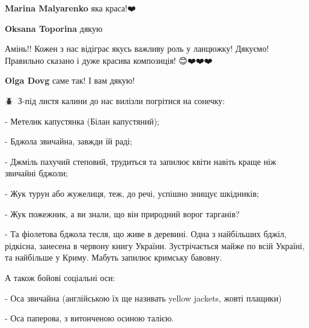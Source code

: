  
 
 
 
 

\qqSecCmt

\textbf{Marina Malyarenko} яка краса!❤️

\begin{itemize} %
\textbf{Oksana Toporina} дякую🥰
\end{itemize} %


Амінь!! Кожен з нас відіграє якусь важливу роль у ланцюжку! Дякуємо! Правильно
сказано і дуже красива композиція! 😊❤️❤️❤️

\begin{itemize} %
\textbf{Olga Dovg} саме так! І вам дякую!💛💛💛
\end{itemize} %


🪲🦋🐝З-під листя калини до нас вилізли погрітися на сонечку:\par
- Метелик капустянка (Білан капустяний);\par
- Бджола звичайна, завжди їй раді;\par
- Джміль пахучий степовий, трудиться та запилює квіти навіть краще ніж звичайні бджоли;\par
- Жук турун або жужелиця, теж, до речі, успішно знищує шкідників;\par
- Жук пожежник, а ви знали, що він природний ворог тарганів?\par
- Та фіолетова бджола тесля, що живе в деревині. Одна з найбільших бджіл, рідкісна, занесена в червону книгу України. Зустрічається майже по всій Україні, та найбільше у Криму. Мабуть запилює кримську бавовну.\par
А також бойові соціальні оси:\par
- Оса звичайна (англійською їх ще називать yellow jackets, жовті плащики)\par
- Оса паперова, з витонченою осиною талією.\par

